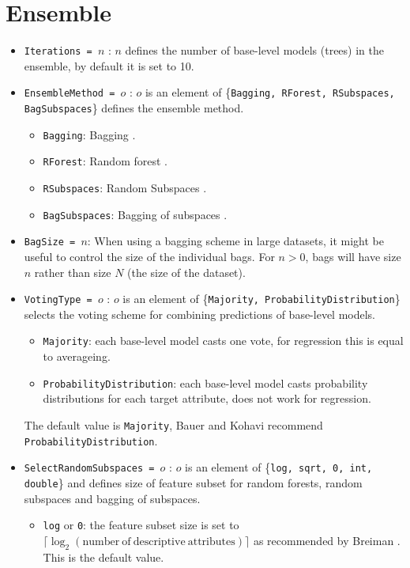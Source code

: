 \documentclass[a4paper]{report}
\begin{document}
\section{Ensemble}
\begin{itemize}
	\item \texttt{Iterations = $n$} : $n$ defines the number of base-level models (trees) in the ensemble, by default it is set to 10.
	\item \texttt{EnsembleMethod = $o$} : $o$ is an element of \{\texttt{Bagging, RForest, RSubspaces, BagSubspaces}\} defines the ensemble method.
	\begin{itemize}
		\item \texttt{Bagging}: Bagging \cite{Breiman1996}.
		\item \texttt{RForest}: Random forest \cite{Breiman2001}.
		\item \texttt{RSubspaces}: Random Subspaces \cite{Ho1998}.
		\item \texttt{BagSubspaces}: Bagging of subspaces \cite{PanovDzeroski2007}.
	\end{itemize}
	\item \texttt{BagSize = $n$}: When using a bagging scheme in large datasets, it might be useful to control the size of the individual bags. For $n > 0$, bags will have size $n$ rather than size $N$ (the size of the dataset).
	\item \texttt{VotingType = $o$} : $o$ is an element of \{\texttt{Majority, ProbabilityDistribution}\} selects the voting scheme for combining predictions of base-level models.
	\begin{itemize}
		\item \texttt{Majority}: each base-level model casts one vote, for regression this is equal to averageing.
		\item \texttt{ProbabilityDistribution}: each base-level model casts probability distributions for each target attribute, does not work for regression.
	\end{itemize}
	The default value is \texttt{Majority}, Bauer and Kohavi \cite{BauerKohavi1999} recommend \texttt{ProbabilityDistribution}.
	\item \texttt{SelectRandomSubspaces = $o$} : $o$ is an element of \{\texttt{log, sqrt, 0, int, double}\} and defines size of feature subset for random forests, random subspaces and bagging of subspaces. 
	\begin{itemize}
		\item \texttt{log} or \texttt{0}: the feature subset size is set to $\lceil{\log_2(\mathrm{number\ of\ descriptive\ attributes})}\rceil$ as recommended by Breiman \cite{Breiman2001}. This is the default value.

\end{itemize}
\end{itemize}
\end{document}

